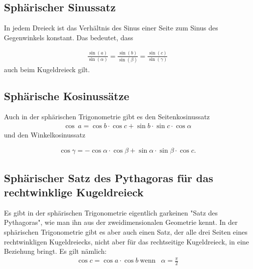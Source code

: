 \subsection{Sphärischer Sinussatz}
In jedem Dreieck ist das Verhältnis des Sinus einer Seite zum Sinus des Gegenwinkels konstant. 
Das bedeutet, dass

\begin{align}
	\frac{\sin (a)}{\sin (\alpha)} =\frac{\sin (b)}{\sin (\beta)} = \frac{\sin (c)}{\sin (\gamma)} \nonumber
\end{align}
auch beim Kugeldreieck gilt.

\subsection{Sphärische Kosinussätze}
Auch in der sphärischen Trigonometrie gibt es den Seitenkosinussatz
\begin{align}
	\cos \ a = \cos b \cdot \cos c + \sin b \cdot \sin c \cdot \cos \alpha \nonumber
\end{align} %
und den Winkelkosinussatz

\begin{align}
	\cos \gamma = -\cos \alpha \cdot \cos \beta + \sin \alpha \cdot \sin \beta \cdot \cos c. \nonumber
\end{align}

\subsection{Sphärischer Satz des Pythagoras für das rechtwinklige Kugeldreieck}
Es gibt in der sphärischen Trigonometrie eigentlich garkeinen "Satz des Pythagoras", wie man ihn aus der zweidimensionalen Geometrie kennt.
In der sphärischen Trigonometrie gibt es aber auch einen Satz, der alle drei Seiten eines rechtwinkligen Kugeldreiecks, nicht aber für das rechtseitige Kugeldreieck, in eine Beziehung bringt. 
Es gilt nämlich:
\begin{align}
	\cos c = \cos a \cdot \cos b \ \text{wenn} \nonumber &
	\alpha = \frac{\pi}{2} \nonumber
\end{align}
 